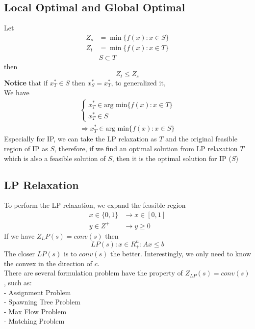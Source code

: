 				\subsection{Local Optimal and Global Optimal}
					Let 
					\begin{align}
						Z_s &= \min \{f(x):x\in S\} \\
						Z_t &= \min \{f(x):x\in T\}  \\
						& S \subset T 
					\end{align}
					then\\
					\begin{equation}Z_t \le Z_s  \end{equation}
					\textbf{Notice} that if $x_T^* \in S$ then $x_S^*=x_T^*$, to generalized it, \\
					We have
					\begin{align}
						\begin{cases}x_T^* \in \text{arg min} \{f(x): x\in T\} \\ x_T^* \in S\end{cases} \\ \Rightarrow x_T^*\in \text{arg min} \{f(x): x\in S\} 
					\end{align}
					Especially for IP, we can take the LP relaxation as $T$ and the original feasible region of IP as $S$, therefore, if we find an optimal solution from LP relaxation $T$ which is also a feasible solution of $S$, then it is the optimal solution for IP ($S$)

				\subsection{LP Relaxation}
					To perform the LP relaxation, we expand the feasible region
					\begin{align}
						x \in \{0,1\} & \rightarrow x\in [0, 1]  \\
						y\in Z^+ & \rightarrow y \ge 0 
					\end{align}
					If we have $Z_LP(s) = conv(s)$ then
					\begin{equation} LP(s): {x\in R_+^n: Ax\le b}\end{equation}
					The closer $LP(s)$ is to $conv(s)$ the better. Interestingly, we only need to know the convex in the direction of $c$.\\
					There are several formulation problem have the property of $Z_{LP}(s) = conv(s)$, such as:\\
					\indent- Assignment Problem\\
					\indent- Spawning Tree Problem\\
					\indent- Max Flow Problem\\
					\indent- Matching Problem

